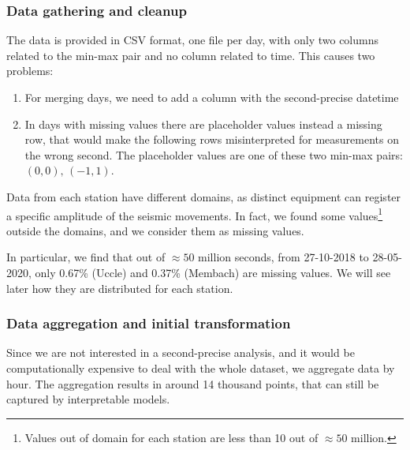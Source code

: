 \documentclass[12pt]{article}
\begin{document}
\subsubsection{Data gathering and cleanup}
The data is provided in CSV format, one file per day, with only two columns related to the min-max pair \cite{Data20200402} and no column related to time. This causes two problems:
\begin{enumerate}[topsep=0.5em,itemsep=0em,partopsep=0.5em]
	\item For merging days, we need to add a column with the second-precise datetime
	\item In days with missing values there are placeholder values instead a missing row, that would make the following rows misinterpreted for measurements on the wrong second. The placeholder values are one of these two min-max pairs: $(0,0),\, (-1,1)$.
\end{enumerate}

Data from each station have different domains, as distinct equipment can register a specific amplitude of the seismic movements. In fact, we found some values\footnote{Values out of domain for each station are less than 10 out of $\approx50$ million.} outside the domains, and we consider them as missing values.

In particular, we find that out of $\approx50$ million seconds, from 27-10-2018 to 28-05-2020, only 0.67\% (Uccle) and 0.37\% (Membach) are missing values. We will see later how they are distributed for each station.



\subsubsection{Data aggregation and initial transformation}
Since we are not interested in a second-precise analysis, and it would be computationally expensive to deal with the whole dataset, we aggregate data by hour. The aggregation results in around 14 thousand points, that can still be captured by interpretable models.
\end{document}
